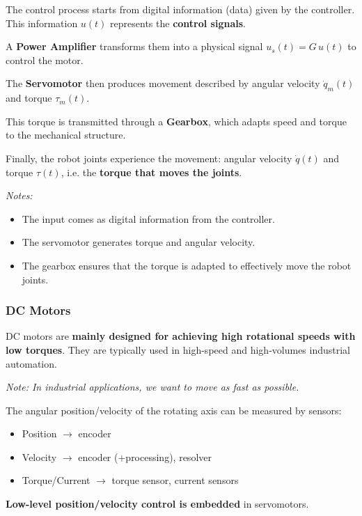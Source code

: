 The control process starts from digital information (data) given by the controller. 
This information $u(t)$ represents the \textbf{control signals}.

A \textbf{Power Amplifier} transforms them into a physical signal $u_s(t)=G\,u(t)$ to control the motor.

The \textbf{Servomotor} then produces movement described by angular velocity $\dot{q}_m(t)$ and torque $\tau_m(t)$.

This torque is transmitted through a \textbf{Gearbox}, which adapts speed and torque to the mechanical structure.

Finally, the robot joints experience the movement: angular velocity $\dot{q}(t)$ and torque $\tau(t)$, i.e. the \textbf{torque that moves the joints}.

\textit{Notes:}
\begin{itemize}
  \item The input comes as digital information from the controller.
  \item The servomotor generates torque and angular velocity.
  \item The gearbox ensures that the torque is adapted to effectively move the robot joints.
\end{itemize}

\hfill

\subsubsection*{DC Motors}

DC motors are \textbf{mainly designed for achieving high rotational speeds with low torques}.  
They are typically used in high-speed and high-volumes industrial automation.  

\textit{Note: In industrial applications, we want to move as fast as possible.}

The angular position/velocity of the rotating axis can be measured by sensors:
\begin{itemize}
    \item Position $\rightarrow$ encoder
    \item Velocity $\rightarrow$ encoder (+processing), resolver
    \item Torque/Current $\rightarrow$ torque sensor, current sensors
\end{itemize}

\textbf{Low-level position/velocity control is embedded} in servomotors.  

